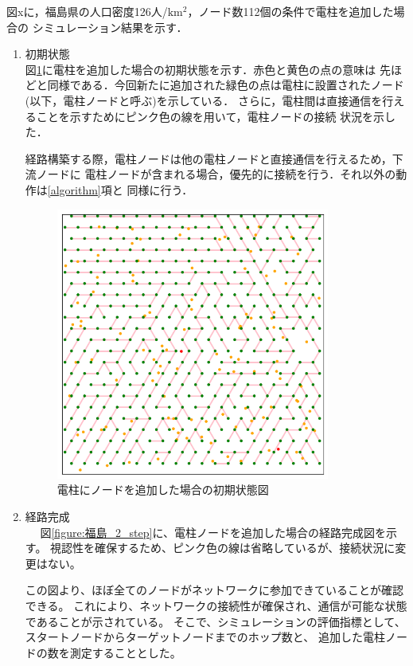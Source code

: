 \documentclass[a4paper, 11pt]{ltjsarticle}
\begin{document}
図xに，福島県の人口密度126人/$\mathrm{km^2}$，ノード数112個の条件で電柱を追加した場合の
シミュレーション結果を示す．
\begin{enumerate}[label=\textbf{(\arabic*)}]
  \item 初期状態 \\
  図\ref{figure:福島_1_step}に電柱を追加した場合の初期状態を示す．赤色と黄色の点の意味は
  先ほどと同様である．今回新たに追加された緑色の点は電柱に設置されたノード(以下，電柱ノードと呼ぶ)を示している．
  さらに，電柱間は直接通信を行えることを示すためにピンク色の線を用いて，電柱ノードの接続
  状況を示した．

  経路構築する際，電柱ノードは他の電柱ノードと直接通信を行えるため，下流ノードに
  電柱ノードが含まれる場合，優先的に接続を行う．それ以外の動作は\ref{algorithm}項と
  同様に行う．
  \clearpage
  \begin{figure}[h]
    \centering
    \includegraphics[width=90mm]{福島_1_step.png}
    \caption{電柱にノードを追加した場合の初期状態図}
    \label{figure:福島_1_step}
  \end{figure}

  \item 経路完成 \\　
  図\ref{figure:福島_2_step}に、電柱ノードを追加した場合の経路完成図を示す。
  視認性を確保するため、ピンク色の線は省略しているが、接続状況に変更はない。

  この図より、ほぼ全てのノードがネットワークに参加できていることが確認できる。
  これにより、ネットワークの接続性が確保され、通信が可能な状態であることが示されている。
  そこで、シミュレーションの評価指標として、スタートノードからターゲットノードまでのホップ数と、
  追加した電柱ノードの数を測定することとした。


\end{enumerate}
\end{document}
